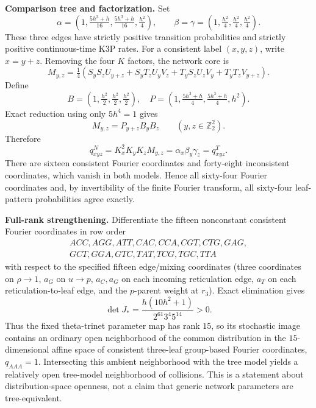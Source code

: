 \documentclass[10pt]{article}
\begin{document}
\textbf{Comparison tree and factorization.}
Set
\[
\alpha=(1,\tfrac{5h^3+h}{16},\tfrac{5h^3+h}{16},\tfrac{h^2}{4}),\qquad
\beta=\gamma=(1,\tfrac{h^2}{4},\tfrac{h^2}{4},\tfrac{h^2}{4}).
\]
These three edges have strictly positive transition probabilities and strictly positive continuous-time K3P rates.  For a consistent label $(x,y,z)$, write $x=y+z$.  Removing the four $K$ factors, the network core is
\[
M_{y,z}=\tfrac14(S_yS_zU_{y+z}+S_yT_zU_yV_z+T_yS_zU_zV_y+T_yT_zV_{y+z}).
\]
Define
\[
B=(1,\tfrac{h^2}{2},\tfrac{h^2}{2},\tfrac{h^2}{2}),\quad
P=(1,\tfrac{5h^3+h}{4},\tfrac{5h^3+h}{4},h^2).
\]
Exact reduction using only $5h^4=1$ gives
\[
\boxed{M_{y,z}=P_{y+z}B_yB_z}\qquad(y,z\in\mathbb Z_2^2).
\]
Therefore
\[
q^N_{xyz}=K_x^2K_yK_zM_{y,z}=\alpha_x\beta_y\gamma_z=q^T_{xyz}.
\]
There are sixteen consistent Fourier coordinates and forty-eight inconsistent coordinates, which vanish in both models.  Hence all sixty-four Fourier coordinates and, by invertibility of the finite Fourier transform, all sixty-four leaf-pattern probabilities agree exactly.

\newpage
\textbf{Full-rank strengthening.}
Differentiate the fifteen nonconstant consistent Fourier coordinates in row order
\[
\begin{gathered}
ACC,AGG,ATT,CAC,CCA,CGT,CTG,GAG,\\
GCT,GGA,GTC,TAT,TCG,TGC,TTA
\end{gathered}
\]
with respect to the specified fifteen edge/mixing coordinates (three coordinates on $\rho\to1$, $a_G$ on $u\to p$, $a_C,a_G$ on each incoming reticulation edge, $a_T$ on each reticulation-to-leaf edge, and the $p$-parent weight at $r_3$).  Exact elimination gives
\[
\boxed{\det J_*=\frac{h(10h^2+1)}{2^{61}3^4 5^{14}}>0.}
\]
Thus the fixed theta-trinet parameter map has rank $15$, so its stochastic image contains an ordinary open neighborhood of the common distribution in the $15$-dimensional affine space of consistent three-leaf group-based Fourier coordinates, $q_{AAA}=1$.  Intersecting this ambient neighborhood with the tree model yields a relatively open tree-model neighborhood of collisions.  This is a statement about distribution-space openness, not a claim that generic network parameters are tree-equivalent.
\end{document}
